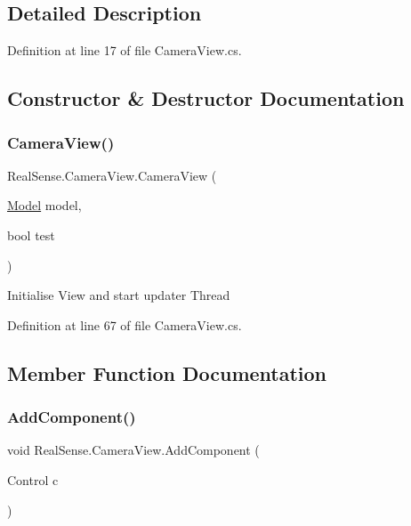 \subsection{Detailed Description}


Definition at line 17 of file Camera\+View.\+cs.



\subsection{Constructor \& Destructor Documentation}
\mbox{\label{class_real_sense_1_1_camera_view_ac30953a5ea5feba14c2243833e2e5908}} 
\subsubsection{\texorpdfstring{Camera\+View()}{CameraView()}}
{\footnotesize\ttfamily Real\+Sense.\+Camera\+View.\+Camera\+View (\begin{DoxyParamCaption}\item[{\hyperlink{class_real_sense_1_1_model}{Model}}]{model,  }\item[{bool}]{test }\end{DoxyParamCaption})}

Initialise View and start updater Thread 

Definition at line 67 of file Camera\+View.\+cs.



\subsection{Member Function Documentation}
\mbox{\label{class_real_sense_1_1_camera_view_a67c8ee2cdbf0caf43e48043d90c0d549}} 
\subsubsection{\texorpdfstring{Add\+Component()}{AddComponent()}}
{\footnotesize\ttfamily void Real\+Sense.\+Camera\+View.\+Add\+Component (\begin{DoxyParamCaption}\item[{Control}]{c }\end{DoxyParamCaption})}



